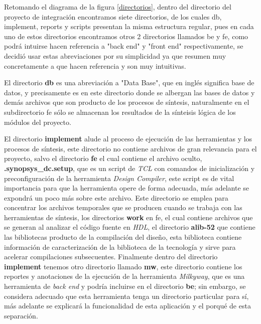 Retomando el diagrama de la figura \ref{directorios}, dentro del directorio del proyecto de integración encontramos siete directorios, de los cuales db, implement, reports y scripts presentan la misma estructura regular, pues en cada uno de estos directorios encontramos otros 2 directorios llamados be y fe, como podrá intuirse hacen referencia a "back end" y "front end" respectivamente, se decidió usar estas abreviaciones por su simplicidad ya que resumen muy concretamente a que hacen referencia y son muy intuitivas.

El directorio \textbf{db} es una abreviación a "Data Base", que en inglés significa base de datos, y precisamente es en este directorio donde se albergan las bases de datos y demás archivos que son producto de los procesos de síntesis, naturalmente en el subdirectorio fe sólo se almacenan los resultados de la sínteisis lógica de los módulos del proyecto.

El directorio \textbf{implement} alude al proceso de ejecución de las herramientas y los procesos de síntesis, este directorio no contiene archivos de gran relevancia para el proyecto, salvo el directorio \textbf{fe} el cual contiene el archivo oculto, \textbf{.synopsys\_dc.setup}, que es un script de \textit{TCL} con comandos de inicialización y preconfiguración de la herramienta \textit{Design Compiler}, este script es de vital importancia para que la herramienta opere de forma adecuada, más adelante se expondrá un poco más sobre este archivo. Este directorio se emplea para concentrar los archivos temporales que se producen cuando se trabaja con las herramientas de síntesis, los directorios \textbf{work} en fe, el cual contiene archivos que se generan al analizar el código fuente en \textit{HDL}, el directorio \textbf{alib-52} que contiene las bibliotecas producto de la compilación del diseño, esta biblioteca contiene información de caracterización de la biblioteca de la tecnología y sirve para acelerar compilaciones subsecuentes. Finalmente dentro del directorio \textbf{implement} tenemos otro directorio llamado \textbf{mw}, este directorio contiene los reportes y anotaciones de la ejecución de la herramienta \textit{Milkyway}, que es una herramienta de \textit{back end} y podría incluirse en el directorio \textbf{be}; sin embargo, se considera adecuado que esta herramienta tenga un directorio particular para sí, más adelante se explicará la funcionalidad de esta aplicación y el porqué de esta separación.

